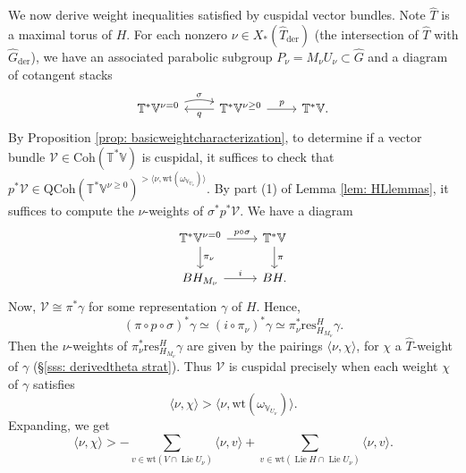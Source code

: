 \documentclass{amsart}
\theoremstyle{definition}
\theoremstyle{remark}
\numberwithin{equation}{section}
\DeclareMathOperator{\Lie}{Lie}
\newcommand{\der}{\mathrm{der}}
\newcommand{\mc}{\mathcal}
\newcommand{\wh}{\widehat}
\newcommand{\res}{\mathrm{res}}
\newcommand{\QCoh}{\mathrm{QCoh}}
\newcommand{\Coh}{\mathrm{Coh}}
\newcommand{\V}{\mathbb{V}}
\newcommand{\T}{\mathbb{T}}
\newcommand{\wt}{\mathrm{wt}}
\begin{document}
We now derive weight inequalities satisfied by cuspidal vector bundles. Note $\wh{T}$ is a maximal torus of $H$. For each nonzero $\nu \in X_{\ast}(\wh{T}_{\der})$ (the intersection of $\wh{T}$ with $\wh G_{\der}$), we have an associated parabolic subgroup $P_{\nu} = M_{\nu}U_{\nu}\subset \wh G$ and a diagram of cotangent stacks
\begin{equation*}
\begin{tikzcd}
      \T^{\ast} \V^{\nu = 0} \arrow[r, "\sigma", bend left = 15] & \T^{\ast} \V^{\nu \geq 0} \arrow[r, "p"] \arrow[l, "q"] & \T^{\ast} \V.
\end{tikzcd}
\end{equation*}
By Proposition \ref{prop: basicweightcharacterization}, to determine if a vector bundle $\mc{V} \in \Coh(\T^{\ast}\V)$ is cuspidal, it suffices to check that $p^{\ast} \mc{V} \in \QCoh(\T^{\ast} \V^{\nu \geq 0})^{>\langle \nu, \wt(\omega_{\V_{U_\nu}})\rangle}$. By part (1) of Lemma \ref{lem: HLlemmas}, it suffices to compute the $\nu$-weights of $\sigma^{\ast} p^{\ast} \mc{V}$. We have a diagram
\begin{equation*}
    \begin{tikzcd}
       \T^{\ast}\V^{\nu = 0} \arrow[r, "p \circ \sigma"] \arrow[d, "\pi_{\nu}"] & \T^{\ast} \V \arrow[d, "\pi"] \\
       BH_{M_{\nu}} \arrow[r, "i"] & B H.
    \end{tikzcd}
\end{equation*}
Now, $\mc{V} \cong \pi^{\ast} \gamma$ for some representation $\gamma$ of $H$. Hence,
\begin{equation*}
   (\pi \circ p \circ \sigma)^{\ast} \gamma \simeq (i \circ \pi_{\nu})^{\ast} \gamma \simeq \pi^{\ast}_{\nu}\res^{H}_{H_{M_{\nu}}} \gamma.
\end{equation*}
Then the $\nu$-weights of $\pi^{\ast}_{\nu} \res^{H}_{H_{M_{\nu}}} \gamma$ are given by the pairings $\langle \nu, \chi \rangle$, for $\chi$ a $\wh{T}$-weight of $\gamma$ (\S \ref{sss: derivedtheta strat}). Thus $\mc{V}$ is cuspidal precisely when each weight $\chi$ of $\gamma$ satisfies
\begin{equation*}
    \langle \nu , \chi \rangle > \langle \nu, \wt(\omega_{\V_{U_\nu}}) \rangle.
\end{equation*}
Expanding, we get 
\begin{equation*}
     \langle \nu , \chi \rangle > -\sum\limits_{v \in \wt(V \cap \Lie U_{\nu})} \langle \nu, v \rangle + \sum\limits_{v \in \wt(\Lie H \cap \Lie U_{\nu})} \langle \nu, v \rangle.
\end{equation*}
\end{document}
